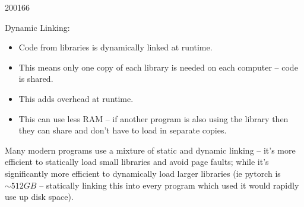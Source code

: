 \documentclass[10pt,\jkfside,a4paper]{article}
\begin{document}
\begin{examquestion}{2001}{6}{6}
\begin{enumerate}
\begin{itemize}
\end{itemize}

Dynamic Linking:

\begin{itemize}

\item Code from libraries is dynamically linked at runtime.

\item This means only one copy of each library is needed on each computer --
code is shared.

\item This adds overhead at runtime.

\item This can use less RAM -- if another program is also using the library
then they can share and don't have to load in separate copies.

\end{itemize}

Many modern programs use a mixture of static and dynamic linking -- it's
more efficient to statically load small libraries and avoid page faults; while
it's significantly more efficient to dynamically load larger libraries
(ie pytorch is $\sim 512GB$ -- statically linking this into every program which
used it would rapidly use up disk space).

\end{enumerate}

\end{examquestion}
\end{document}
